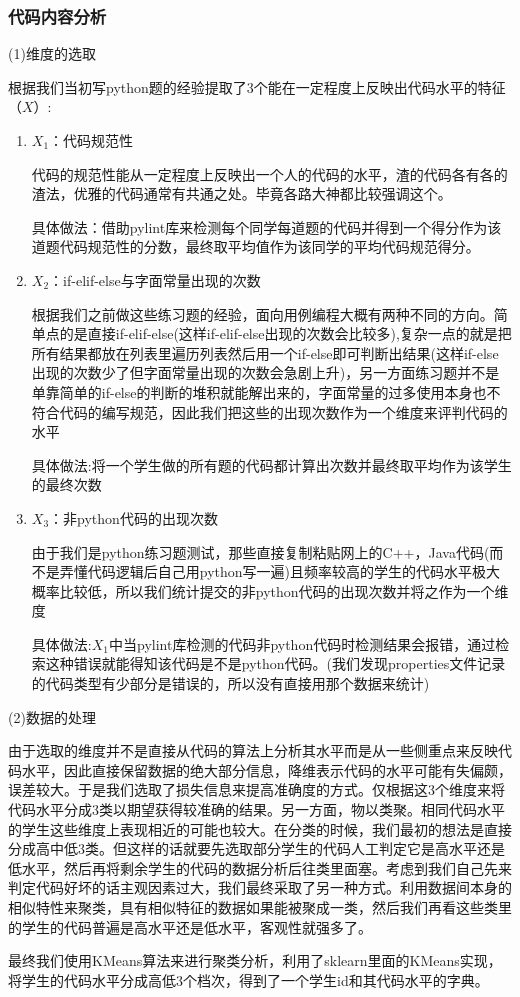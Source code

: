 \documentclass[UTF8]{ctexart}
\begin{document}
	\subsubsection{代码内容分析}
	\par (1)维度的选取
	\par 根据我们当初写python题的经验提取了3个能在一定程度上反映出代码水平的特征（$X$）:
	\par
	\begin{enumerate}
		\item $X_1$：代码规范性
		\par 代码的规范性能从一定程度上反映出一个人的代码的水平，渣的代码各有各的渣法，优雅的代码通常有共通之处。毕竟各路大神都比较强调这个。
		\par 具体做法：借助pylint库来检测每个同学每道题的代码并得到一个得分作为该道题代码规范性的分数，最终取平均值作为该同学的平均代码规范得分。
		\item $X_2$：if-elif-else与字面常量出现的次数
		\par 根据我们之前做这些练习题的经验，面向用例编程大概有两种不同的方向。简单点的是直接if-elif-else(这样if-elif-else出现的次数会比较多),复杂一点的就是把所有结果都放在列表里遍历列表然后用一个if-else即可判断出结果(这样if-else出现的次数少了但字面常量出现的次数会急剧上升)，另一方面练习题并不是单靠简单的if-else的判断的堆积就能解出来的，字面常量的过多使用本身也不符合代码的编写规范，因此我们把这些的出现次数作为一个维度来评判代码的水平
		\par 具体做法:将一个学生做的所有题的代码都计算出次数并最终取平均作为该学生的最终次数
		\item $X_3$：非python代码的出现次数
		\par 由于我们是python练习题测试，那些直接复制粘贴网上的C++，Java代码(而不是弄懂代码逻辑后自己用python写一遍)且频率较高的学生的代码水平极大概率比较低，所以我们统计提交的非python代码的出现次数并将之作为一个维度
		\par 具体做法:$X_1$中当pylint库检测的代码非python代码时检测结果会报错，通过检索这种错误就能得知该代码是不是python代码。(我们发现properties文件记录的代码类型有少部分是错误的，所以没有直接用那个数据来统计)
	\end{enumerate}
	\par (2)数据的处理
	\par 由于选取的维度并不是直接从代码的算法上分析其水平而是从一些侧重点来反映代码水平，因此直接保留数据的绝大部分信息，降维表示代码的水平可能有失偏颇，误差较大。于是我们选取了损失信息来提高准确度的方式。仅根据这3个维度来将代码水平分成3类以期望获得较准确的结果。另一方面，物以类聚。相同代码水平的学生这些维度上表现相近的可能也较大。在分类的时候，我们最初的想法是直接分成高中低3类。但这样的话就要先选取部分学生的代码人工判定它是高水平还是低水平，然后再将剩余学生的代码的数据分析后往类里面塞。考虑到我们自己先来判定代码好坏的话主观因素过大，我们最终采取了另一种方式。利用数据间本身的相似特性来聚类，具有相似特征的数据如果能被聚成一类，然后我们再看这些类里的学生的代码普遍是高水平还是低水平，客观性就强多了。
	\par 最终我们使用KMeans算法来进行聚类分析，利用了sklearn里面的KMeans实现，将学生的代码水平分成高低3个档次，得到了一个学生id和其代码水平的字典。
	
\end{document}
